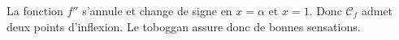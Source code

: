 \begin{enumerate}
\begin{enumerate}
\begin{center}
			\end{center}
		La fonction $f''$ s'annule et change de signe en $x=\alpha$ et $x=1$. Donc $\mathcal{C}_f$ admet deux points d'inflexion. Le toboggan assure donc de bonnes sensations.
\end{enumerate} 
	
\end{enumerate}

\bigskip
